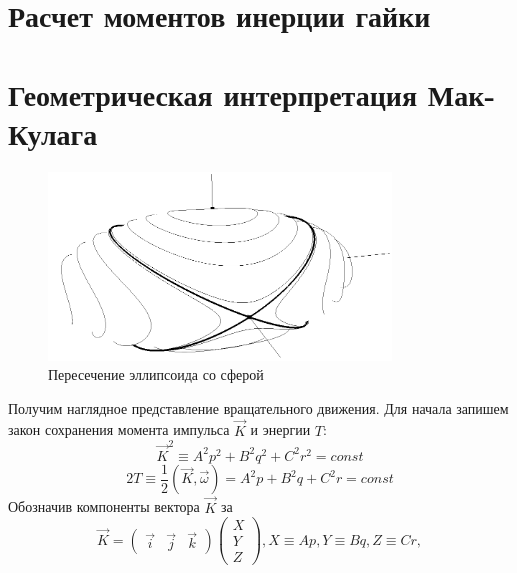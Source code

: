 \documentclass{article}
\begin{document}
\section{Расчет моментов инерции гайки}


\section{Геометрическая интерпретация Мак-Кулага}
\begin{figure}[h]
\includegraphics[height=5cm]{ellipsoid}
\caption{Пересечение эллипсоида со сферой}
\end{figure}
Получим наглядное представление вращательного движения. Для начала запишем закон сохранения момента импульса \begin{math} \vec{K} \end{math} и энергии \begin{math} T \end{math}:
\begin{equation}
\label{angularMomentumInv}
\vec{K}^2\equiv A^2p^2+B^2q^2+C^2r^2=const
\end{equation}
\begin{equation}
\label{energyInv}
2T\equiv\frac{1}{2}\left(\vec{K},\vec{\omega}\right)=A^2p+B^2q+C^2r=const
\end{equation}
Обозначив компоненты вектора \begin{math} \vec{K} \end{math} за
\begin{equation}
\vec{K}=
\left(
\begin{array}{lcr}
\vec{i} & \vec{j} & \vec{k}
\end{array}
\right)
\left(
\begin{array}{lcr}
X\\
Y\\
Z
\end{array}
\right),
X\equiv Ap,Y\equiv Bq,Z\equiv Cr,
\end{equation}
\end{document}
